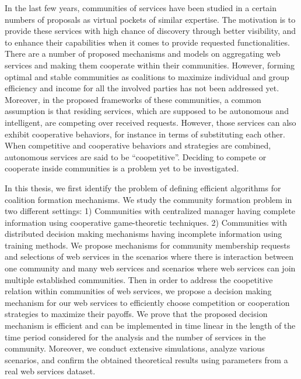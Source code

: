 
In the last few years, communities of services have been studied in a certain numbers of proposals as virtual pockets of similar expertise. The motivation is to provide these services with high chance of discovery through better visibility, and to enhance their capabilities when it comes to provide requested functionalities. There are a number of proposed mechanisms and models on aggregating web services and making them cooperate within their communities. However, forming optimal and stable communities as coalitions to maximize individual and group efficiency and income for all the involved parties has not been addressed yet. Moreover, in the proposed frameworks of these communities, a common assumption is that residing services, which are supposed to be autonomous and intelligent, are competing over received requests. However, those services can also exhibit cooperative behaviors, for instance in terms of substituting each other. When competitive and cooperative behaviors and strategies are combined, autonomous services are said to be ``coopetitive''. Deciding to compete or cooperate inside communities is a problem yet to be investigated.

In this thesis, we first identify the problem of defining efficient algorithms for coalition formation mechanisms. We study the community formation problem in two different settings: 1) Communities with centralized manager having complete information using cooperative game-theoretic techniques. 2) Communities with distributed decision making mechanisms having incomplete information using training methods. We propose mechanisms for community membership requests and selections of web services in the scenarios where there is interaction between one community and many web services and scenarios where web services can join multiple established communities. Then in order to address the coopetitive relation within communities of web services, we propose a decision making mechanism for our web services to efficiently choose competition or cooperation strategies to maximize their payoffs. We prove that the proposed decision mechanism is efficient and can be implemented in time linear in the length of the time period considered for the analysis and the number of services in the community. Moreover, we conduct extensive simulations, analyze various scenarios, and confirm the obtained theoretical results using parameters from a real web services dataset.


